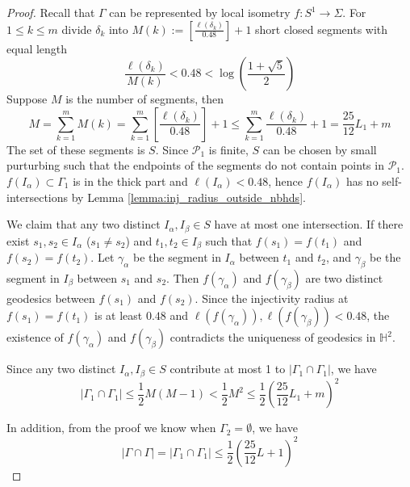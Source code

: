 \documentclass[11pt, a4paper]{article}
\theoremstyle{definition}
\theoremstyle{remark}
\newcommand{\bbh}{\mathbb{H}}
\newcommand{\cald}{\mathcal{D}}
\newcommand{\calp}{\mathcal{P}}
\newcommand{\abs}[1]{\left| #1 \right|}
\newcommand{\gauss}[1]{\left[ #1 \right]}
\newcommand{\bracket}[1]{\left( #1 \right)}
\begin{document}
\begin{proof}

Recall that $\Gamma$ can be represented by local isometry $f:S^1\rightarrow\Sigma$. For $1\leqslant k\leqslant m$ divide $\delta_k$ into $M(k):=\gauss{\frac{\ell(\delta_k)}{0.48}}+1$ short closed segments with equal length 
$$\frac{\ell(\delta_k)}{M(k)}<0.48<\log\bracket{\frac{1+\sqrt5}2}$$
Suppose $M$ is the number of segments, then
$$M=\sum_{k=1}^{m}M(k)=\sum_{k=1}^{m}\gauss{\frac{\ell(\delta_k)}{0.48}}+1\leqslant\sum_{k=1}^{m}{\frac{\ell(\delta_k)}{0.48}}+1=\frac{25}{12}L_1+m$$
The set of these segments is $S$. Since $\calp_1$ is finite, $S$ can be chosen by small purturbing such that the endpoints of the segments do not contain points in $\calp_1$. 
$f(I_\alpha)\subset\Gamma_1$ is in the thick part and $\ell(I_\alpha)<0.48$, hence $f(I_\alpha)$ has no self-intersections by Lemma \ref{lemma:inj_radius_outside_nbhds}. 

We claim that any two distinct $I_\alpha, I_\beta\in S$ have at most one intersection. If there exist $s_1,s_2\in I_\alpha$ ($s_1\neq s_2$) and $t_1,t_2\in I_\beta$ such that $f(s_1)=f(t_1)$ and $f(s_2)=f(t_2)$. Let $\gamma_\alpha$ be the segment in $I_\alpha$ between $t_1$ and $t_2$, and $\gamma_\beta$ be the segment in $I_\beta$ between $s_1$ and $s_2$. Then $f(\gamma_\alpha)$ and $f(\gamma_\beta)$ are two distinct geodesics between $f(s_1)$ and $f(s_2)$. Since the injectivity radius at $f(s_1)=f(t_1)$ is at least $0.48$ and $\ell(f(\gamma_\alpha)),\ell(f(\gamma_\beta))<0.48$, the existence of $f(\gamma_\alpha)$ and $f(\gamma_\beta)$ contradicts the uniqueness of geodesics in $\bbh^2$.

Since any two distinct $I_\alpha, I_\beta\in S$ contribute at most 1 to $\abs{\Gamma_1\cap\Gamma_1}$, we have
$$\abs{\Gamma_1\cap\Gamma_1}\leqslant\frac12M(M-1)<\frac12M^2\leqslant \frac12\bracket{\frac{25}{12}L_1+m}^2$$

In addition, from the proof we know when $\Gamma_2=\emptyset$, we have
$$\abs{\Gamma\cap\Gamma}=\abs{\Gamma_1\cap\Gamma_1}\leqslant \frac12\bracket{\frac{25}{12}L+1}^2$$



\end{proof}
\end{document}
